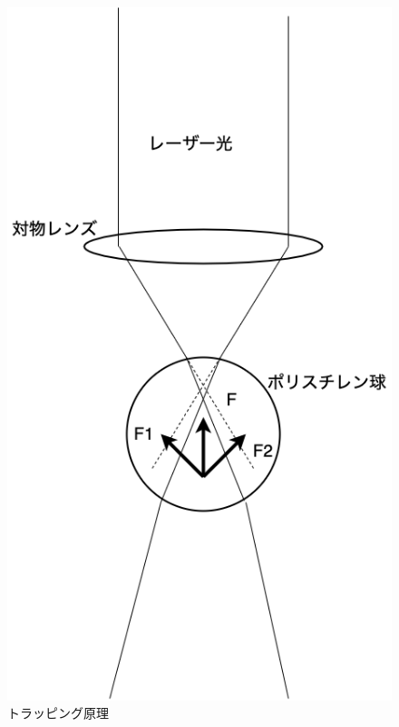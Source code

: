 \documentclass[11pt, a4paper,twocolumn]{jarticle}
\begin{document}
\begin{figure}[htbp]
 \begin{center}
  \includegraphics[width=0.8\linewidth]{fig1-2.png}
 \end{center}
 \caption{トラッピング原理}
 \label{fig:1-2}
\end{figure}


\newpage
\end{document}
